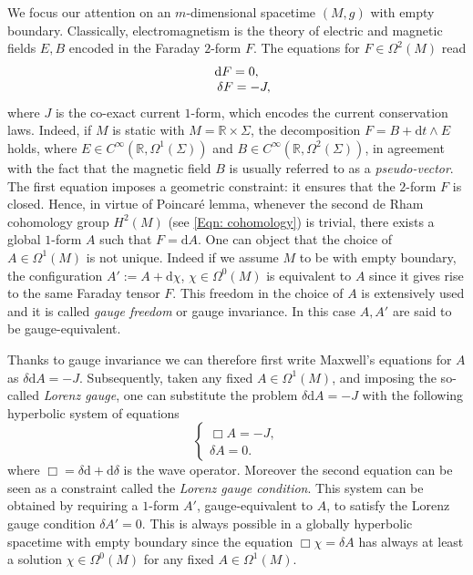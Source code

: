 We focus our attention on an $m$-dimensional spacetime $(M,g)$ with empty boundary. Classically, electromagnetism is the theory of electric and magnetic fields $E,B$ encoded in the Faraday $2$-form $F$. The equations for $F\in\Omega^2(M)$ read 
\begin{align}\label{Eqn: Maxwellsequation}
	\begin{array}{c}
	\mathrm{d}F=0,\\
	\hspace{0.4cm}\delta F=-J,
	\end{array} 
\end{align}
where $J$ is the co-exact current $1$-form, which encodes the current conservation laws. Indeed, if $M$ is static with $M=\mathbb{R}\times\Sigma$, the decomposition $F=B+\mathrm{d}t\wedge E$ holds, where $E\in C^\infty(\mathbb{R},\Omega^1(\Sigma))$ and $B\in C^\infty(\mathbb{R},\Omega^2(\Sigma))$, in agreement with the fact that the magnetic field $B$ is usually referred to as a \textit{pseudo-vector}.\\
The first equation imposes a geometric constraint: it ensures that the $2$-form $F$ is closed. Hence, in virtue of Poincar\'e lemma, whenever the second de Rham cohomology group $H^2(M)$ (see \ref{Eqn: cohomology}) is trivial, there exists a global $1$-form $A$ such that $F=\mathrm{d}A$. One can object that the choice of $A\in\Omega^{1}(M)$ is not unique. Indeed if we assume $M$ to be with empty boundary, the configuration $A':=A+\mathrm{d}\chi$, $\chi\in\Omega^0(M)$ is equivalent to $A$ since it gives rise to the same Faraday tensor $F$. This freedom in the choice of $A$ is extensively used and it is called \emph{gauge freedom} or gauge invariance. In this case $A,A'$ are said to be gauge-equivalent.

Thanks to gauge invariance we can therefore first write Maxwell's equations for $A$ as $\delta\mathrm{d}A=-J$. Subsequently, taken any fixed $A\in\Omega^1(M)$, and imposing the so-called \emph{Lorenz gauge}, one can substitute the problem $\delta\mathrm{d}A=-J$ with the following hyperbolic system of equations
\begin{equation}
	\begin{cases}
	\Box A=-J,\\
	\delta A=0.
	\end{cases}
\end{equation}
where $\Box=\delta\mathrm{d}+\mathrm{d}\delta$ is the wave operator. Moreover the second equation can be seen as a constraint called the \emph{Lorenz gauge condition}. This system can be obtained by requiring a $1$-form $A'$, gauge-equivalent to $A$, to satisfy the Lorenz gauge condition $\delta A'=0$. This is always possible in a globally hyperbolic spacetime with empty boundary since the equation $\Box\chi=\delta A$ has always at least a solution $\chi\in\Omega^0(M)$ for any fixed $A\in\Omega^1(M)$.\\


